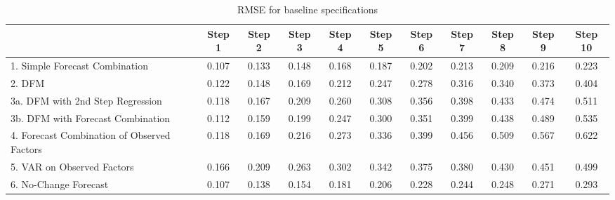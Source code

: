 \documentclass[11pt]{article}
\begin{document}
\newpage
{\normalsize \clearpage
\begin{table}
\center
\caption{RMSE for baseline specifications} \label{table_rmse_baseline}
\begin{tabular}{|l|c|c|c|c|c|c|c|c|c|c|}
\hline
&Step 1 &Step 2 &Step 3 &Step 4 &Step 5 &Step 6 &Step 7 &Step 8 &Step 9 &Step 10\\
\hline
1. Simple Forecast Combination             &0.107&0.133&0.148&0.168&0.187&0.202&0.213&0.209&0.216&0.223\\
2. DFM                                                       &0.122&0.148&0.169&0.212&0.247&0.278&0.316&0.340&0.373&0.404\\
3a. DFM with 2nd Step Regression           &0.118&0.167&0.209&0.260&0.308&0.356&0.398&0.433&0.474&0.511\\
3b. DFM with Forecast Combination          &0.112&0.159&0.199&0.247&0.300&0.351&0.399&0.438&0.489&0.535\\
4. Forecast Combination of Observed Factors&0.118&0.169&0.216&0.273&0.336&0.399&0.456&0.509&0.567&0.622\\
5. VAR on Observed Factors                 &0.166&0.209&0.263&0.302&0.342&0.375&0.380&0.430&0.451&0.499\\
6. No-Change Forecast                      &0.107&0.138&0.154&0.181&0.206&0.228&0.244&0.248&0.271&0.293\\
\hline
\end{tabular}
\end{table}
}
\end{document}
